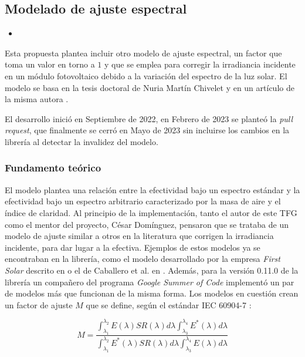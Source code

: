 \subsection{Modelado de ajuste espectral}

\begin{itemize}
    \item {}
\end{itemize}

Esta propuesta plantea incluir otro modelo de ajuste espectral, un factor que toma un valor en torno a $1$ y que se emplea para corregir la irradiancia incidente en un módulo fotovoltaico debido a la variación del espectro de la luz solar. El modelo se basa en la tesis doctoral de Nuria Martín Chivelet \cite{Martín_Chivelet_1999} y en un artículo de la misma autora \cite{Martín_Ruiz_1999}.

El desarrollo inició en Septiembre de 2022, en Febrero de 2023 se planteó la \textit{pull request}, que finalmente se cerró en Mayo de 2023 sin incluirse los cambios en la librería al detectar la invalidez del modelo.

\subsubsection{Fundamento teórico}

El modelo \cite{Martín_Ruiz_1999} plantea una relación entre la efectividad bajo un espectro estándar y la efectividad bajo un espectro arbitrario caracterizado por la masa de aire y el índice de claridad. Al principio de la implementación, tanto el autor de este TFG como el mentor del proyecto, César Domínguez, pensaron que se trataba de un modelo de ajuste similar a otros en la literatura que corrigen la irradiancia incidente, para dar lugar a la efectiva. Ejemplos de estos modelos ya se encontraban en la librería, como el modelo desarrollado por la empresa \textit{First Solar} descrito en \cite{Lee_Panchula_2016} o el de Caballero et al. en \cite{Caballero_Fernández_Theristis_Almonacid_Nofuentes_2018}. Además, para la versión 0.11.0 de la librería un compañero del programa \textit{Google Summer of Code} implementó un par de modelos más que funcionan de la misma forma. Los modelos en cuestión crean un factor de ajuste $M$ que se define, según el estándar IEC 60904-7 \cite[Eq. (2)]{Caballero_Fernández_Theristis_Almonacid_Nofuentes_2018}:

\begin{equation}
    M = \frac
    {\int_{\lambda_1}^{\lambda_2} E(\lambda) SR(\lambda) d\lambda \int_{\lambda_3}^{\lambda_4} E^*(\lambda) d\lambda}
    {\int_{\lambda_1}^{\lambda_2} E^*(\lambda) SR(\lambda) d\lambda \int_{\lambda_3}^{\lambda_4} E(\lambda) d\lambda}
\end{equation}

